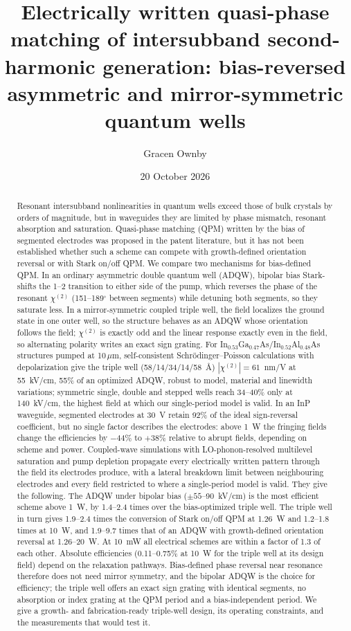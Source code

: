 \documentclass[11pt]{article}
\title{Electrically written quasi-phase matching of intersubband second-harmonic generation: bias-reversed asymmetric and mirror-symmetric quantum wells}
\author{Gracen Ownby}
\affil{University of Oklahoma, Norman, Oklahoma, USA}
\date{\small 20 October 2026}
\newcommand{\chitwo}{\chi^{(2)}}
\newcommand{\um}{\,\mu\mathrm{m}}
\begin{document}
\maketitle

\begin{abstract}
Resonant intersubband nonlinearities in quantum wells exceed those of bulk crystals by orders of magnitude, but in waveguides they are limited by phase mismatch, resonant absorption and saturation. Quasi-phase matching (QPM) written by the bias of segmented electrodes was proposed in the patent literature, but it has not been established whether such a scheme can compete with growth-defined orientation reversal or with Stark on/off QPM. We compare two mechanisms for bias-defined QPM. In an ordinary asymmetric double quantum well (ADQW), bipolar bias Stark-shifts the 1--2 transition to either side of the pump, which reverses the phase of the resonant $\chitwo$ (151--189$^\circ$ between segments) while detuning both segments, so they saturate less. In a mirror-symmetric coupled triple well, the field localizes the ground state in one outer well, so the structure behaves as an ADQW whose orientation follows the field; $\chitwo$ is exactly odd and the linear response exactly even in the field, so alternating polarity writes an exact sign grating. For In$_{0.53}$Ga$_{0.47}$As/In$_{0.52}$Al$_{0.48}$As structures pumped at 10$\um$, self-consistent Schr\"odinger--Poisson calculations with depolarization give the triple well (58/14/34/14/58~\AA) $|\chitwo|=61$~nm/V at 55~kV/cm, 55\% of an optimized ADQW, robust to model, material and linewidth variations; symmetric single, double and stepped wells reach 34--40\% only at 140~kV/cm, the highest field at which our single-period model is valid. In an InP waveguide, segmented electrodes at 30~V retain 92\% of the ideal sign-reversal coefficient, but no single factor describes the electrodes: above 1~W the fringing fields change the efficiencies by $-44\%$ to $+38\%$ relative to abrupt fields, depending on scheme and power. Coupled-wave simulations with LO-phonon-resolved multilevel saturation and pump depletion propagate every electrically written pattern through the field its electrodes produce, with a lateral breakdown limit between neighbouring electrodes and every field restricted to where a single-period model is valid. They give the following. The ADQW under bipolar bias ($\pm55$--90~kV/cm) is the most efficient scheme above 1~W, by 1.4--2.4 times over the bias-optimized triple well. The triple well in turn gives 1.9--2.4 times the conversion of Stark on/off QPM at 1.26~W and 1.2--1.8 times at 10~W, and 1.9--9.7 times that of an ADQW with growth-defined orientation reversal at 1.26--20~W. At 10~mW all electrical schemes are within a factor of 1.3 of each other. Absolute efficiencies (0.11--0.75\% at 10~W for the triple well at its design field) depend on the relaxation pathways. Bias-defined phase reversal near resonance therefore does not need mirror symmetry, and the bipolar ADQW is the choice for efficiency; the triple well offers an exact sign grating with identical segments, no absorption or index grating at the QPM period and a bias-independent period. We give a growth- and fabrication-ready triple-well design, its operating constraints, and the measurements that would test it.

\end{abstract}
\end{document}
